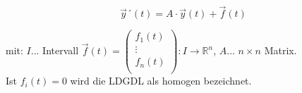 
\[ \vec{y}´(t)=A\cdot\vec{y}(t) + \vec{f}(t)\]

mit: $I$... Intervall $\vec{f}(t)=\left(
    \begin{array}{r}
        f_1(t)\\
        \vdots\\
        f_n(t)\\
    \end{array} \right) : I \rightarrow \mathbb{R}^n$, $A$... $n\times n$ Matrix.\\
    Ist $f_i(t) = 0$ wird die LDGDL als homogen bezeichnet.